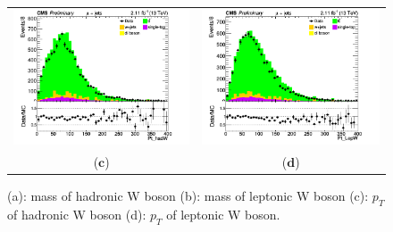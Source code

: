 \documentclass{cmspaper}
\begin{document}
\begin{figure}[htp]
\begin{tabular}{cc}
\includegraphics[scale=0.40]{results/Pt_hadW.png}
& \hspace{-0.5cm} \includegraphics[scale=0.40]{results/Pt_LepW.png}\\
   ($\mathbf{c}$)\qquad\qquad&($\mathbf{d}$)\qquad\qquad\qquad\\
\end{tabular}
\caption{(a): mass of hadronic W boson (b): mass of leptonic W boson (c): $p_{T}$ of hadronic W boson (d): $p_{T}$ of leptonic W boson.}\label{W_boson}
\end{figure}
\end{document}
